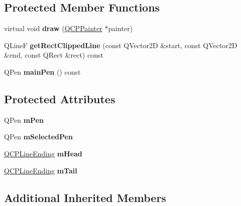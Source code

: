 \subsection*{Protected Member Functions}
\begin{DoxyCompactItemize}
\item 
\hypertarget{class_q_c_p_item_line_a1fc045dd33919f8006df0692aeb0e84a}{}\label{class_q_c_p_item_line_a1fc045dd33919f8006df0692aeb0e84a} 
virtual void {\bfseries draw} (\hyperlink{class_q_c_p_painter}{Q\+C\+P\+Painter} $\ast$painter)
\item 
\hypertarget{class_q_c_p_item_line_ae61e504ad3b94aa86bfd02f734fb17b0}{}\label{class_q_c_p_item_line_ae61e504ad3b94aa86bfd02f734fb17b0} 
Q\+LineF {\bfseries get\+Rect\+Clipped\+Line} (const Q\+Vector2D \&start, const Q\+Vector2D \&end, const Q\+Rect \&rect) const
\item 
\hypertarget{class_q_c_p_item_line_af8b5370462515b279578d8b4a57bd3b4}{}\label{class_q_c_p_item_line_af8b5370462515b279578d8b4a57bd3b4} 
Q\+Pen {\bfseries main\+Pen} () const
\end{DoxyCompactItemize}
\subsection*{Protected Attributes}
\begin{DoxyCompactItemize}
\item 
\hypertarget{class_q_c_p_item_line_abbb544d5bb927dfe4e81a7f3ca4c65ac}{}\label{class_q_c_p_item_line_abbb544d5bb927dfe4e81a7f3ca4c65ac} 
Q\+Pen {\bfseries m\+Pen}
\item 
\hypertarget{class_q_c_p_item_line_aff858ad6dde3b90024814ca4b116f278}{}\label{class_q_c_p_item_line_aff858ad6dde3b90024814ca4b116f278} 
Q\+Pen {\bfseries m\+Selected\+Pen}
\item 
\hypertarget{class_q_c_p_item_line_a51603f28ab7ddb1c1a95ea384791d3ed}{}\label{class_q_c_p_item_line_a51603f28ab7ddb1c1a95ea384791d3ed} 
\hyperlink{class_q_c_p_line_ending}{Q\+C\+P\+Line\+Ending} {\bfseries m\+Head}
\item 
\hypertarget{class_q_c_p_item_line_ab8ed61dfe15bbb1cbf9b95eae95e242f}{}\label{class_q_c_p_item_line_ab8ed61dfe15bbb1cbf9b95eae95e242f} 
\hyperlink{class_q_c_p_line_ending}{Q\+C\+P\+Line\+Ending} {\bfseries m\+Tail}
\end{DoxyCompactItemize}
\subsection*{Additional Inherited Members}


